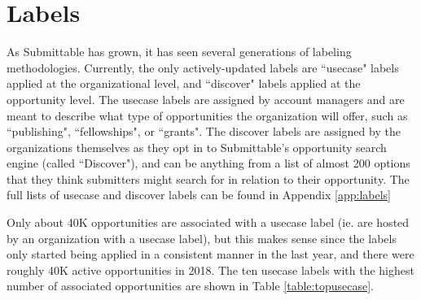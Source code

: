 \documentclass[]{report}   %
\begin{document}
\section{Labels}
As Submittable has grown, it has seen several generations of labeling methodologies. Currently, the only actively-updated labels are ``usecase" labels applied at the organizational level, and ``discover" labels applied at the opportunity level. The usecase labels are assigned by account managers and are meant to describe what type of opportunities the organization will offer, such as ``publishing", ``fellowships", or ``grants". The discover labels are assigned by the organizations themselves as they opt in to Submittable's opportunity search engine (called ``Discover"), and can be anything from a list of almost 200 options that they think submitters might search for in relation to their opportunity. The full lists of usecase and discover labels can be found in Appendix \ref{app:labels}

Only about 40K opportunities are associated with a usecase label (ie. are hosted by an organization with a usecase label), but this makes sense since the labels only started being applied in a consistent manner in the last year, and there were roughly 40K active opportunities in 2018. The ten usecase labels with the highest number of associated opportunities are shown in Table \ref{table:topusecase}.  
\end{document}
